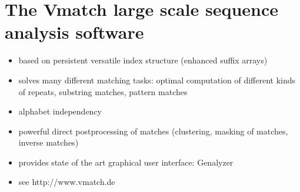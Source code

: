 \documentclass[12pt]{article}
\begin{document}
\section*{
The Vmatch large scale sequence analysis software
}
\begin{itemize}
\item
based on persistent versatile index structure (enhanced suffix arrays)
\item
solves many different matching tasks: optimal computation of different
kinds of repeats, substring matches, pattern matches
\item
alphabet independency
\item
powerful direct postprocessing of matches (clustering, masking of matches,
inverse matches)
\item
provides state of the art graphical user interface: Genalyzer
\item
see http://www.vmatch.de
\end{itemize}
\end{document}
